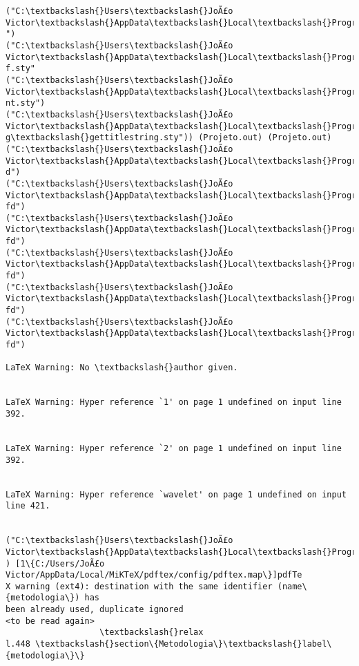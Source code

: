 \documentclass[11pt]{article}
\begin{document}
\begin{Verbatim}[commandchars=\\\{\}]
("C:\textbackslash{}Users\textbackslash{}JoÃ£o Victor\textbackslash{}AppData\textbackslash{}Local\textbackslash{}Programs\textbackslash{}MiKTeX\textbackslash{}tex/latex/ucs\textbackslash{}ucsencs.def
")
("C:\textbackslash{}Users\textbackslash{}JoÃ£o Victor\textbackslash{}AppData\textbackslash{}Local\textbackslash{}Programs\textbackslash{}MiKTeX\textbackslash{}tex/latex/hyperref\textbackslash{}namere
f.sty"
("C:\textbackslash{}Users\textbackslash{}JoÃ£o Victor\textbackslash{}AppData\textbackslash{}Local\textbackslash{}Programs\textbackslash{}MiKTeX\textbackslash{}tex/latex/refcount\textbackslash{}refcou
nt.sty")
("C:\textbackslash{}Users\textbackslash{}JoÃ£o Victor\textbackslash{}AppData\textbackslash{}Local\textbackslash{}Programs\textbackslash{}MiKTeX\textbackslash{}tex/generic/gettitlestrin
g\textbackslash{}gettitlestring.sty")) (Projeto.out) (Projeto.out)
("C:\textbackslash{}Users\textbackslash{}JoÃ£o Victor\textbackslash{}AppData\textbackslash{}Local\textbackslash{}Programs\textbackslash{}MiKTeX\textbackslash{}tex/latex/psnfss\textbackslash{}ot1ppl.f
d")
("C:\textbackslash{}Users\textbackslash{}JoÃ£o Victor\textbackslash{}AppData\textbackslash{}Local\textbackslash{}Programs\textbackslash{}MiKTeX\textbackslash{}tex/latex/psnfss\textbackslash{}omlzplm.
fd")
("C:\textbackslash{}Users\textbackslash{}JoÃ£o Victor\textbackslash{}AppData\textbackslash{}Local\textbackslash{}Programs\textbackslash{}MiKTeX\textbackslash{}tex/latex/psnfss\textbackslash{}omszplm.
fd")
("C:\textbackslash{}Users\textbackslash{}JoÃ£o Victor\textbackslash{}AppData\textbackslash{}Local\textbackslash{}Programs\textbackslash{}MiKTeX\textbackslash{}tex/latex/psnfss\textbackslash{}omxzplm.
fd")
("C:\textbackslash{}Users\textbackslash{}JoÃ£o Victor\textbackslash{}AppData\textbackslash{}Local\textbackslash{}Programs\textbackslash{}MiKTeX\textbackslash{}tex/latex/psnfss\textbackslash{}ot1zplm.
fd")
("C:\textbackslash{}Users\textbackslash{}JoÃ£o Victor\textbackslash{}AppData\textbackslash{}Local\textbackslash{}Programs\textbackslash{}MiKTeX\textbackslash{}tex/latex/jknappen\textbackslash{}ursfs.
fd")

LaTeX Warning: No \textbackslash{}author given.


LaTeX Warning: Hyper reference `1' on page 1 undefined on input line 392.


LaTeX Warning: Hyper reference `2' on page 1 undefined on input line 392.


LaTeX Warning: Hyper reference `wavelet' on page 1 undefined on input line 421.


("C:\textbackslash{}Users\textbackslash{}JoÃ£o Victor\textbackslash{}AppData\textbackslash{}Local\textbackslash{}Programs\textbackslash{}MiKTeX\textbackslash{}tex/latex/base\textbackslash{}t1cmtt.fd"
) [1\{C:/Users/JoÃ£o Victor/AppData/Local/MiKTeX/pdftex/config/pdftex.map\}]pdfTe
X warning (ext4): destination with the same identifier (name\{metodologia\}) has
been already used, duplicate ignored
<to be read again>
                   \textbackslash{}relax
l.448 \textbackslash{}section\{Metodologia\}\textbackslash{}label\{metodologia\}\}


\end{Verbatim}
\end{document}
